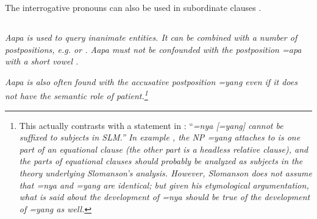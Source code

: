 The interrogative pronouns can also be used in subordinate clauses  .





\subsection{}\label{sec:wc:aapa}
\em Aapa \em is used to query inanimate entities. It can be combined with a number of postpositions, e.g.  or  . \em Aapa \em must not be confounded with the postposition \em =apa \em with a short vowel .






\em Aapa \em is also often found with the accusative postposition \em =yang \em even if it does not have the semantic role of patient.\footnote{This actually contrasts with a statement in \citet[150]{Slomanson2006cll}: ``\em =nya \em [=\em yang\em] cannot be suffixed to subjects in SLM.''  In example , the NP \em =yang \em attaches to is one part of an equational clause (the other part is a headless relative clause), and the parts of equational clauses should probably be analyzed as subjects in the theory underlying Slomanson's analysis. However, Slomanson does not assume that \em =nya \em and \em =yang \em are identical; but given his etymological argumentation, what is said about the development of \em =nya \em should be true of the development of \em =yang \em as well.}

